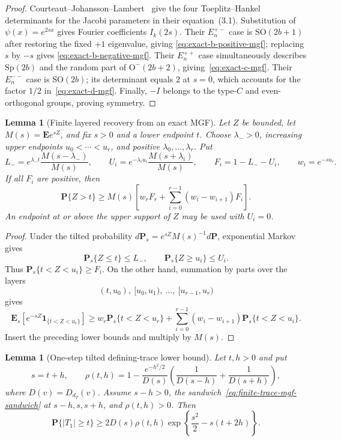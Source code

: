 \documentclass[11pt,reqno]{amsart}
\theoremstyle{plain}
\newtheorem{lemma}[theorem]{Lemma}
\theoremstyle{definition}
\begin{document}
\begin{proof}
Courteaut--Johansson--Lambert~\cite[Lemma~3.1]{CJL2022} give the four
Toeplitz--Hankel determinants for the Jacobi parameters in their
equation~(3.1).  Substitution of $\psi(x)=e^{2sx}$ gives Fourier
coefficients $I_k(2s)$.  Their $E_n^{+-}$ case is
$\mathrm{SO}(2b+1)$ after restoring the fixed $+1$ eigenvalue, giving
\eqref{eq:exact-b-positive-mgf}; replacing $s$ by $-s$ gives
\eqref{eq:exact-b-negative-mgf}.  Their $E_n^{++}$ case simultaneously
describes $\mathrm{Sp}(2b)$ and the random part of
$\mathrm O^-(2b+2)$, giving~\eqref{eq:exact-c-mgf}.  Their $E_n^{--}$
case is $\mathrm{SO}(2b)$; its determinant equals $2$ at $s=0$, which
accounts for the factor $1/2$ in~\eqref{eq:exact-d-mgf}.  Finally,
$-I$ belongs to the type-$C$ and even-orthogonal groups, proving symmetry.
\end{proof}

\begin{lemma}[Finite layered recovery from an exact MGF]
\label{lem:finite-layered-mgf-recovery}
Let $Z$ be bounded, let $M(s)=\mathbf Ee^{sZ}$, and fix $s>0$ and a lower
endpoint $t$.  Choose $\lambda_->0$, increasing upper endpoints
$u_0<\cdots<u_r$, and positive $\lambda_0,\ldots,\lambda_r$.  Put
\[
 L_-=e^{\lambda_-t}\frac{M(s-\lambda_-)}{M(s)},
 \qquad
 U_i=e^{-\lambda_i u_i}\frac{M(s+\lambda_i)}{M(s)},
 \qquad F_i=1-L_--U_i,
 \qquad w_i=e^{-su_i}.
\]
If all $F_i$ are positive, then
\begin{equation}
\label{eq:finite-layered-mgf-recovery}
 \mathbf P\{Z>t\}\geq M(s)
 \left[w_rF_r+\sum_{i=0}^{r-1}(w_i-w_{i+1})F_i\right].
\end{equation}
An endpoint at or above the upper support of $Z$ may be used with $U_i=0$.
\end{lemma}

\begin{proof}
Under the tilted probability
$d\mathbf P_s=e^{sZ}M(s)^{-1}d\mathbf P$, exponential Markov gives
\[
 \mathbf P_s\{Z\leq t\}\leq L_-,
 \qquad
 \mathbf P_s\{Z\geq u_i\}\leq U_i.
\]
Thus $\mathbf P_s\{t<Z<u_i\}\geq F_i$.  On the other hand, summation by
parts over the layers
\[
 (t,u_0),\ [u_0,u_1),\ \ldots,\ [u_{r-1},u_r)
\]
gives
\[
 \mathbf E_s[e^{-sZ}\mathbf1_{\{t<Z<u_r\}}]
 \geq w_r\mathbf P_s\{t<Z<u_r\}
 +\sum_{i=0}^{r-1}(w_i-w_{i+1})
  \mathbf P_s\{t<Z<u_i\}.
\]
Insert the preceding lower bounds and multiply by $M(s)$.
\end{proof}

\begin{lemma}[One-step tilted defining-trace lower bound]
\label{lem:one-step-trace-tilt}
Let $t,h>0$ and put
\[
 s=t+h,
 \qquad
 \rho(t,h)=1-
 \frac{e^{-h^2/2}}{D(s)}
 \left(\frac1{D(s-h)}
       +\frac1{D(s+h)}\right),
\]
where $D(v)=D_{d_T}(v)$.  Assume $s-h>0$, the
sandwich~\eqref{eq:finite-trace-mgf-sandwich} at
$s-h,s,s+h$, and $\rho(t,h)>0$.  Then
\begin{equation}
\label{eq:one-step-trace-tilt}
 \mathbf P\{|T_1|\geq t\}
 \geq2D(s)\rho(t,h)
 \exp\left\{\frac{s^2}{2}-s(t+2h)\right\}.
\end{equation}
\end{lemma}
\end{document}

